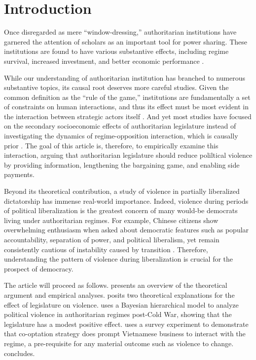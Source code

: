 \section{Introduction}
\label{sec:introduction}

Once disregarded as mere ``window-dressing,'' authoritarian institutions have garnered the attention of scholars as an important tool for power sharing. These institutions are found to have various substantive effects, including regime survival, increased investment, and better economic performance \citep{Gandhi2008, Wright2008, Boix2013, Jensen2012}.

While our understanding of authoritarian institution has branched to numerous substantive topics, its causal root deserves more careful studies. Given the common definition as the ``rule of the game,'' institutions are fundamentally a set of constraints on human interactions, and thus its effect must be most evident in the interaction between strategic actors itself \citep{North1990}. And yet most studies have focused on the secondary socioeconomic effects of authoritarian legislature instead of investigating the dynamics of regime-opposition interaction, which is causally prior \citep{Gandhi2007, Svolik2012}. The goal of this article is, therefore, to empirically examine this interaction, arguing that authoritarian legislature should reduce poliltical violence by providing information, lengthening the bargaining game, and enabling side payments.

Beyond its theoretical contribution, a study of violence in partially liberalized dictatorship has immense real-world importance. Indeed, violence during periods of political liberalization is the greatest concern of many would-be democrats living under authoritarian regimes. For example, Chinese citizens show overwhelming enthusiasm when asked about democratic features such as popular accountability, separation of power, and political liberalism, yet remain consistently cautious of instability caused by transition \citep[309]{Chu2008}. Therefore, understanding the pattern of violence during liberalization is crucial for the prospect of democracy.

The article will proceed as follows.  presents an overview of the theoretical argument and empirical analyses.  posits two theoretical explanations for the effect of legislature on violence.  uses a Bayesian hierarchical model to analyze political violence in authoritarian regimes post-Cold War, showing that the legislature has a modest positive effect.  uses a survey experiment to demonstrate that co-optation strategy does prompt Vietnamese business to interact with the regime, a pre-requisite for any material outcome such as violence to change.  concludes.